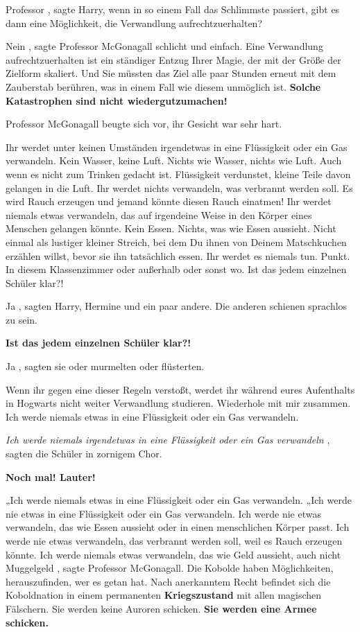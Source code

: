 \glqq Professor\grqq{} , sagte Harry, \glqq wenn in so einem Fall das Schlimmste
passiert, gibt es dann eine Möglichkeit, die Verwandlung
aufrechtzuerhalten?\grqq{}

\glqq Nein\grqq{} , sagte Professor McGonagall schlicht und einfach. \glqq Eine
Verwandlung aufrechtzuerhalten ist ein ständiger Entzug Ihrer Magie, der mit der
Größe der Zielform skaliert. Und Sie müssten das Ziel alle paar Stunden erneut
mit dem Zauberstab berühren, was in einem Fall wie diesem unmöglich ist.
\textbf{ Solche Katastrophen sind nicht wiedergutzumachen!}\grqq{}

Professor McGonagall beugte sich vor, ihr Gesicht war sehr hart.

\glqq Ihr werdet unter keinen Umständen irgendetwas in eine Flüssigkeit oder ein
Gas verwandeln. Kein Wasser, keine Luft. Nichts wie Wasser, nichts wie Luft.
Auch wenn es nicht zum Trinken gedacht ist. Flüssigkeit verdunstet, kleine Teile
davon gelangen in die Luft. Ihr werdet nichts verwandeln, was verbrannt werden
soll. Es wird Rauch erzeugen und jemand könnte diesen Rauch einatmen! Ihr werdet
niemals etwas verwandeln, das auf irgendeine Weise in den Körper eines Menschen
gelangen könnte. Kein Essen. Nichts, was wie Essen aussieht. Nicht einmal als
lustiger kleiner Streich, bei dem Du ihnen von Deinem Matschkuchen erzählen
willst, bevor sie ihn tatsächlich essen. Ihr werdet es niemals tun. Punkt. In
diesem Klassenzimmer oder außerhalb oder sonst wo. Ist das jedem einzelnen
Schüler klar?!\grqq{}

\glqq Ja\grqq{} , sagten Harry, Hermine und ein paar andere. Die anderen
schienen sprachlos zu sein.

\textbf{ \glqq Ist das jedem einzelnen Schüler klar?!\grqq{} }

\glqq Ja\grqq{} , sagten sie oder murmelten oder flüsterten.

\glqq Wenn ihr gegen eine dieser Regeln verstoßt, werdet ihr während eures
Aufenthalts in Hogwarts nicht weiter Verwandlung studieren. Wiederhole mit mir
zusammen. Ich werde niemals etwas in eine Flüssigkeit oder ein Gas
verwandeln.\grqq{}

\glqq \emph{Ich werde niemals irgendetwas in eine Flüssigkeit oder ein Gas
verwandeln}\grqq{} , sagten die Schüler in zornigem Chor.

\glqq \textbf{Noch mal! Lauter! }\grqq{}

„Ich werde niemals etwas in eine Flüssigkeit oder ein Gas verwandeln.\grqq{}
„Ich werde nie etwas in eine Flüssigkeit oder ein Gas verwandeln.\grqq{} \glqq
Ich werde nie etwas verwandeln, das wie Essen aussieht oder in einen
menschlichen Körper passt.\grqq{} \glqq Ich werde nie etwas verwandeln, das
verbrannt werden soll, weil es Rauch erzeugen könnte.\grqq{} \glqq Ich werde
niemals etwas verwandeln, das wie Geld aussieht, auch nicht Muggelgeld\grqq{} ,
sagte Professor McGonagall. \glqq Die Kobolde haben Möglichkeiten,
herauszufinden, wer es getan hat. Nach anerkanntem Recht befindet sich die
Koboldnation in einem permanenten \textbf{Kriegszustand} mit allen magischen
Fälschern. Sie werden keine Auroren schicken. \textbf{Sie werden eine Armee
schicken.}\grqq{}

